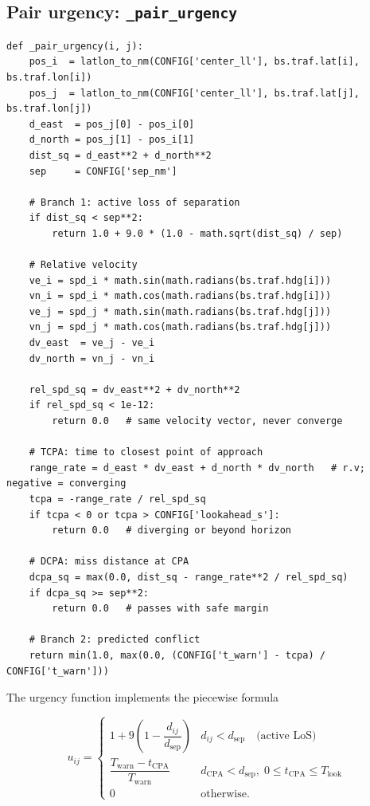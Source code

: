 \documentclass[11pt, a4paper]{article}
\begin{document}
\subsection{Pair urgency: \texttt{\_pair\_urgency}}

\begin{lstlisting}[caption={Computing the urgency $u_{ij}$ between two aircraft.}]
def _pair_urgency(i, j):
    pos_i  = latlon_to_nm(CONFIG['center_ll'], bs.traf.lat[i], bs.traf.lon[i])
    pos_j  = latlon_to_nm(CONFIG['center_ll'], bs.traf.lat[j], bs.traf.lon[j])
    d_east  = pos_j[0] - pos_i[0]
    d_north = pos_j[1] - pos_i[1]
    dist_sq = d_east**2 + d_north**2
    sep     = CONFIG['sep_nm']

    # Branch 1: active loss of separation
    if dist_sq < sep**2:
        return 1.0 + 9.0 * (1.0 - math.sqrt(dist_sq) / sep)

    # Relative velocity
    ve_i = spd_i * math.sin(math.radians(bs.traf.hdg[i]))
    vn_i = spd_i * math.cos(math.radians(bs.traf.hdg[i]))
    ve_j = spd_j * math.sin(math.radians(bs.traf.hdg[j]))
    vn_j = spd_j * math.cos(math.radians(bs.traf.hdg[j]))
    dv_east  = ve_j - ve_i
    dv_north = vn_j - vn_i

    rel_spd_sq = dv_east**2 + dv_north**2
    if rel_spd_sq < 1e-12:
        return 0.0   # same velocity vector, never converge

    # TCPA: time to closest point of approach
    range_rate = d_east * dv_east + d_north * dv_north   # r.v; negative = converging
    tcpa = -range_rate / rel_spd_sq
    if tcpa < 0 or tcpa > CONFIG['lookahead_s']:
        return 0.0   # diverging or beyond horizon

    # DCPA: miss distance at CPA
    dcpa_sq = max(0.0, dist_sq - range_rate**2 / rel_spd_sq)
    if dcpa_sq >= sep**2:
        return 0.0   # passes with safe margin

    # Branch 2: predicted conflict
    return min(1.0, max(0.0, (CONFIG['t_warn'] - tcpa) / CONFIG['t_warn']))
\end{lstlisting}

The urgency function implements the piecewise formula

\begin{equation}
u_{ij} =
\begin{cases}
1 + 9\!\left(1 - \dfrac{d_{ij}}{d_\text{sep}}\right)
  & d_{ij} < d_\text{sep} \quad\text{(active LoS)} \\[8pt]
\dfrac{T_\text{warn} - t_\text{CPA}}{T_\text{warn}}
  & d_\text{CPA} < d_\text{sep},\; 0 \le t_\text{CPA} \le T_\text{look} \\[6pt]
0 & \text{otherwise.}
\end{cases}
\end{equation}
\end{document}
